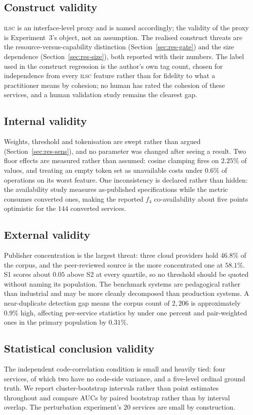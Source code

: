 \documentclass[journal]{IEEEtran}
\newcommand{\ilsc}{\textsc{ilsc}}
\begin{document}
\subsection{Construct validity}
\ilsc{} is an interface-level proxy and is named accordingly; the validity of
the proxy is Experiment~3's object, not an assumption. The realised construct
threats are the resource-versus-capability distinction
(Section~\ref{sec:res-gate}) and the size dependence
(Section~\ref{sec:res-size}), both reported with their numbers. The label used
in the construct regression is the author's own tag count, chosen for
independence from every \ilsc{} feature rather than for fidelity to what a
practitioner means by cohesion; no human has rated the cohesion of these
services, and a human validation study remains the clearest gap.

\subsection{Internal validity}
Weights, threshold and tokenisation are swept rather than argued
(Section~\ref{sec:res-sens}), and no parameter was changed after seeing a
result. Two floor effects are measured rather than assumed: cosine clamping
fires on $2.25\%$ of values, and treating an empty token set as unavailable
costs under $0.6\%$ of operations on its worst feature. One inconsistency is
declared rather than hidden: the availability study measures as-published
specifications while the metric consumes converted ones, making the reported
$f_4$ co-availability about five points optimistic for the $144$ converted
services.

\subsection{External validity}
Publisher concentration is the largest threat: three cloud providers hold
$46.8\%$ of the corpus, and the peer-reviewed source is the more concentrated
one at $58.1\%$. S1 scores about $0.05$ above S2 at every quartile, so no
threshold should be quoted without naming its population. The benchmark systems
are pedagogical rather than industrial and may be more cleanly decomposed than
production systems. A near-duplicate detection gap means the corpus count of
$2{,}206$ is approximately $0.9\%$ high, affecting per-service statistics by
under one percent and pair-weighted ones in the primary population by $0.31\%$.

\subsection{Statistical conclusion validity}
The independent code-correlation condition is small and heavily tied: four
services, of which two have no code-side variance, and a five-level ordinal
ground truth. We report cluster-bootstrap intervals rather than point estimates
throughout and compare AUCs by paired bootstrap rather than by interval overlap.
The perturbation experiment's $20$ services are small by construction.
\end{document}
